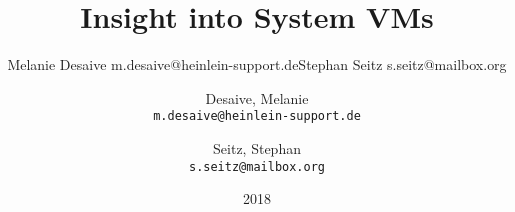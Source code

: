\documentclass[10pt,titlepage]{article}
\begin{document}
\begin{titlepage}
\title{Insight into System VMs}
\date{2018}
\author{Melanie Desaive m.desaive@heinlein-support.de\newline Stephan Seitz s.seitz@mailbox.org}
\author{
  Desaive, Melanie\\
  \texttt{m.desaive@heinlein-support.de}
  \and
  Seitz, Stephan\\
  \texttt{s.seitz@mailbox.org}
}
\maketitle
\end{titlepage}


\tableofcontents

\setcounter{page}{1}

\newpage









\newpage
\listoffigures
{}

\listoftables
{}

\newpage
\appendix



\nocite{*}


\end{document}
